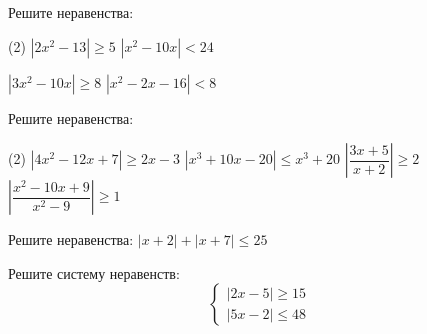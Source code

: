 \begin{class}[number=6]
	\begin{listofex}
		\item Решите неравенства: %
		\begin{tasks}(2)
			\task \( |2x^2-13| \ge 5 \)
			\task \( |x^2-10x|<24 \)
			
			\task \( |3x^2-10x| \ge 8 \)
			\task \( |x^2-2x-16|<8 \)
		\end{tasks}
		\item Решите неравенства: %
		\begin{tasks}(2)
			\task \( |4x^2-12x+7| \ge 2x-3 \)
			\task \( |x^3+10x-20| \le x^3+20 \)
			\task \( \left| \dfrac{ 3x+5 }{ x+2 } \right| \ge 2 \)
			\task \( \left| \dfrac{ x^2-10x+9 }{ x^2-9 } \right| \ge 1 \)
		\end{tasks}
		\item Решите неравенства: %
			\( |x+2|+|x+7| \le 25 \)
		\item Решите систему неравенств: %
		\[ \begin{cases} |2x-5| \ge 15 \\ |5x-2| \le 48 \end{cases} \]
	\end{listofex}
\end{class}

